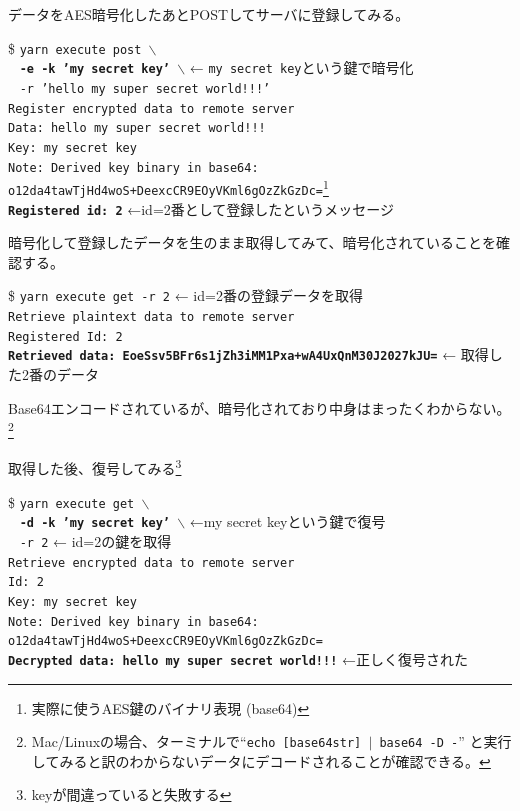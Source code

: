 \documentclass[12pt,dvipdfmx]{beamer}
\begin{document}
\begin{frame}
データをAES暗号化したあとPOSTしてサーバに登録してみる。
\begin{exampleblock}{}\footnotesize
\$ \texttt{yarn execute post $\backslash$}\\
~ \textbf{\texttt{-e -k 'my secret key' $\backslash$}} ← \alert{\texttt{my secret key}という鍵で暗号化}\\
~ \texttt{-r 'hello my super secret world!!!'}\\
\texttt{Register encrypted data to remote server}\\
\texttt{Data: hello my super secret world!!!}\\
\texttt{Key: my secret key}\\
\texttt{Note: Derived key binary in base64: o12da4tawTjHd4woS+DeexcCR9EOyVKml6gOzZkGzDc=}\footnote[frame]{実際に使うAES鍵のバイナリ表現 (base64)}\\
\textbf{\texttt{Registered id: 2}} ←\alert{id=2番として登録したというメッセージ}
\end{exampleblock}

\end{frame}

\begin{frame}
暗号化して登録したデータを生のまま取得してみて、暗号化されていることを確認する。
\begin{exampleblock}{}\footnotesize
\$ \texttt{yarn execute get -r 2} ← \alert{id=2番の登録データを取得}\\
\texttt{Retrieve plaintext data to remote server}\\
\texttt{Registered Id: 2}\\
\textbf{\texttt{Retrieved data: EoeSsv5BFr6s1jZh3iMM1Pxa+wA4UxQnM30J2027kJU=}} ← \alert{取得した2番のデータ}
\end{exampleblock}
Base64エンコードされているが、暗号化されており中身はまったくわからない。\footnote[frame]{Mac/Linuxの場合、ターミナルで``\texttt{echo [base64str] $\mid$ base64 -D -}'' と実行してみると訳のわからないデータにデコードされることが確認できる。}
\end{frame}

\begin{frame}
取得した後、復号してみる\footnote[frame]{keyが間違っていると失敗する}
\begin{exampleblock}{}\footnotesize
\$ \texttt{yarn execute get $\backslash$}\\
~ \textbf{\texttt{-d -k 'my secret key' $\backslash$}} ←\alert{my secret keyという鍵で復号}\\
~ \texttt{-r 2} ← id=2の鍵を取得\\
\texttt{Retrieve encrypted data to remote server}\\
\texttt{Id: 2}\\
\texttt{Key: my secret key}\\
\texttt{Note: Derived key binary in base64: o12da4tawTjHd4woS+DeexcCR9EOyVKml6gOzZkGzDc=}\\
\textbf{\texttt{Decrypted data: hello my super secret world!!!}} ←\alert{正しく復号された}
\end{exampleblock}
\end{frame}
\end{document}
